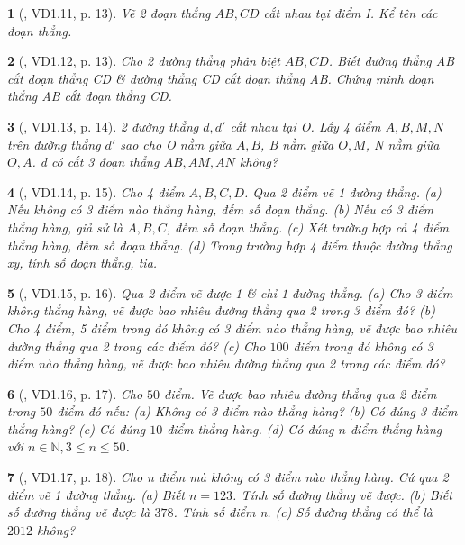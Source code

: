 \documentclass{article}
\newtheorem{baitoan}{}
\begin{document}
\begin{baitoan}[\cite{TLCT_THCS_Toan_6_hinh_hoc}, VD1.11, p. 13]
	Vẽ 2 đoạn thẳng $AB,CD$ cắt nhau tại điểm I. Kể tên các đoạn thẳng.
\end{baitoan}

\begin{baitoan}[\cite{TLCT_THCS_Toan_6_hinh_hoc}, VD1.12, p. 13]
	Cho 2 đường thẳng phân biệt $AB,CD$. Biết đường thẳng AB cắt đoạn thẳng CD \& đường thẳng CD cắt đoạn thẳng AB. Chứng minh đoạn thẳng AB cắt đoạn thẳng CD.
\end{baitoan}

\begin{baitoan}[\cite{TLCT_THCS_Toan_6_hinh_hoc}, VD1.13, p. 14]
	2 đường thẳng $d,d'$ cắt nhau tại O. Lấy 4 điểm $A,B,M,N$ trên đường thẳng $d'$ sao cho O nằm giữa $A,B$, B nằm giữa $O,M$, N nằm giữa $O,A$. d có cắt 3 đoạn thẳng $AB,AM,AN$ không?
\end{baitoan}

\begin{baitoan}[\cite{TLCT_THCS_Toan_6_hinh_hoc}, VD1.14, p. 15]
	Cho 4 điểm $A,B,C,D$. Qua 2 điểm vẽ 1 đường thẳng. (a) Nếu không có 3 điểm nào thẳng hàng, đếm số đoạn thẳng. (b) Nếu có 3 điểm thẳng hàng, giả sử là $A,B,C$, đếm số đoạn thẳng. (c) Xét trường hợp cả 4 điểm thẳng hàng, đếm số đoạn thẳng. (d) Trong trường hợp 4 điểm thuộc đường thẳng xy, tính số đoạn thẳng, tia.
\end{baitoan}

\begin{baitoan}[\cite{TLCT_THCS_Toan_6_hinh_hoc}, VD1.15, p. 16]
	Qua 2 điểm vẽ được 1 \& chỉ 1 đường thẳng. (a) Cho 3 điểm không thẳng hàng, vẽ được bao nhiêu đường thẳng qua 2 trong 3 điểm đó? (b) Cho 4 điểm, 5 điểm trong đó không có 3 điểm nào thẳng hàng, vẽ được bao nhiêu đường thẳng qua 2 trong các điểm đó? (c) Cho $100$ điểm trong đó không có 3 điểm nào thẳng hàng, vẽ được bao nhiêu đường thẳng qua 2 trong các điểm đó?
\end{baitoan}

\begin{baitoan}[\cite{TLCT_THCS_Toan_6_hinh_hoc}, VD1.16, p. 17]
	Cho $50$ điểm. Vẽ được bao nhiêu đường thẳng qua 2 điểm trong $50$ điểm đó nếu: (a) Không có 3 điểm nào thẳng hàng? (b) Có đúng 3 điểm thẳng hàng? (c) Có đúng $10$ điểm thẳng hàng. (d) Có đúng $n$ điểm thẳng hàng với $n\in\mathbb{N},3\le n\le50$.
\end{baitoan}

\begin{baitoan}[\cite{TLCT_THCS_Toan_6_hinh_hoc}, VD1.17, p. 18]
	Cho n điểm mà không có 3 điểm nào thẳng hàng. Cứ qua 2 điểm vẽ 1 đường thẳng. (a) Biết $n = 123$. Tính số đường thẳng vẽ được. (b) Biết số đường thẳng vẽ được là $378$. Tính số điểm n. (c) Số đường thẳng có thể là $2012$ không?
\end{baitoan}
\end{document}
